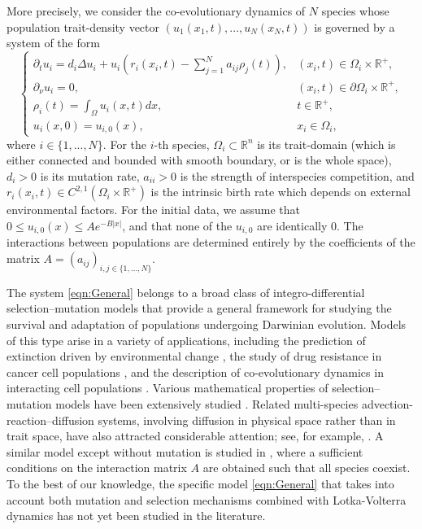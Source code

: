 \documentclass{article}
\begin{document}
More precisely, we consider the co-evolutionary dynamics of $N$ species whose  population trait-density vector $(u_1(x_1,t),...,u_N(x_N,t))$  is governed by a system of the form
\begin{equation}\label{eqn:General}
      \begin{cases}
          \partial_{t}u_i=d_i\Delta{u}_i+u_i\left(r_i(x_i,t)-\sum_{j=1}^Na_{ij}\rho_{j}(t)\right),&(x_i,t)\in\Omega_i\times\mathbb{R}^{+},
    \\
    
    \partial_{\nu}u_i=0,&(x_i,t)\in\partial{\Omega_i}\times\mathbb{R}^{+},\\
    \rho_i(t)=\int_{\Omega}u_i(x,t)dx,&t\in\mathbb{R}^{+},\\
    
    u_i(x,0)=u_{i,0}(x),&x_i\in\Omega_i,
      \end{cases}
  \end{equation}
  where  $i\in\{1,...,N\}$. For the $i$-th species, $\Omega_i\subset\mathbb{R}^n$ is its trait-domain (which is either connected and bounded with smooth boundary, or is the whole space), $d_i>0$ is its mutation rate, $a_{ii}>0$ is the strength of interspecies competition, and $r_i(x_i,t)\in{}C^{2,1}(\Omega_{i}\times\mathbb{R}^{+})$ is the intrinsic birth rate which depends on external environmental factors. For the initial data, we assume that $0\leq{}u_{i,0}(x)\leq{}Ae^{-B|x|}$, and that none of the $u_{i,0}$ are identically $0$. The interactions between populations are determined entirely by the coefficients of the matrix $A=(a_{ij})_{i,j\in\{1,...,N\}}$.  
  
The system \eqref{eqn:General} belongs to a broad class of integro-differential selection--mutation models that provide a general framework for studying the survival and adaptation of populations undergoing Darwinian evolution. Models of this type arise in a variety of applications, including the prediction of extinction driven by environmental change \cite{roques2020adaptation,iglesias2021selection,adaptivedynamicsdivergingfitness}, the study of drug resistance in cancer cell populations \cite{busse2016mass}, and the description of co-evolutionary dynamics in interacting cell populations \cite{nguyen2019adaptive}. Various mathematical properties of selection--mutation models have been extensively studied \cite{barles2009concentration,desvillettes2008selection,alfaro2014explicit,lorenzi2020asymptotic}. Related multi-species advection-reaction--diffusion systems, involving diffusion in physical space rather than in trait space, have also attracted considerable attention; see, for example, \cite{dockery1998evolution,potts2019spatial,giunta2022local,giunta2022detecting,duong2025multi}. A similar model except without mutation is studied in \cite{pouchol2018global}, where a  sufficient conditions on the interaction matrix $A$ are obtained such that all species coexist. To the best of our knowledge, the specific model \eqref{eqn:General} that takes into account both mutation and selection mechanisms {combined with Lotka-Volterra dynamics} has not yet been studied in the literature. 
\end{document}
